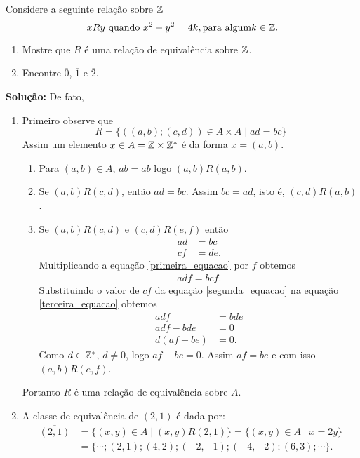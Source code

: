 \documentclass[12pt]{article}
\begin{document}
\vspace{.5cm}

\questao Considere a seguinte relação sobre $\mathbb{Z}$
\[
	xRy \mbox{ quando } x^2 - y^2 = 4k, \mbox{para algum} k \in \mathbb{Z}.
\]

\begin{enumerate}[label={\alph*})]
	\item Mostre que $R$ é uma rela{\c c}{\~a}o de equival{\^e}ncia sobre $\mathbb{Z}$.
	\item Encontre $\overline{0}$, $\overline{1}$ e $\overline{2}$.
\end{enumerate}

\noindent\textbf{Solu\c{c}\~ao:} De fato,
	\begin{enumerate}[label={\alph*})]
		\item Primeiro observe que
		\[
			R = \{((a,b);(c,d)) \in A \times A \mid ad = bc\}
		\]
		Assim um elemento $x \in A = \mathbb{Z}\times\mathbb{Z}^*$ é da forma $x = (a,b)$.
		\begin{enumerate}[label={\roman*})]
			\item Para $(a,b) \in A$, $ab = ab$ logo $(a,b)R(a,b)$.
			\item Se $(a,b)R(c,d)$, então $ad = bc$. Assim $bc = ad$, isto é, $(c,d)R(a,b)$.
			\item Se $(a,b)R(c,d)$ e $(c,d)R(e,f)$ então
			\begin{align}
				ad &= bc\label{primeira_equacao}\\
				cf &= de.\label{segunda_equacao}
			\end{align}
			Multiplicando a equação \eqref{primeira_equacao} por $f$ obtemos
			\begin{align}\label{terceira_equacao}
				adf = bcf.
			\end{align}
			Substituindo o valor de $cf$ da equação \eqref{segunda_equacao} na equação \eqref{terceira_equacao} obtemos
			\begin{align*}
				adf &= bde\\
				adf - bde &= 0\\
				d(af - be) &= 0.
			\end{align*}
			Como $d \in \mathbb{Z}^*$, $d \ne 0$, logo $af - be = 0$. Assim $af = be$ e com isso $(a,b)R(e,f)$.
		\end{enumerate}

		Portanto $R$ é uma relação de equivalência sobre $A$.

		\item A classe de equivalência de $\overline{(2,1)}$ é dada por:
		\begin{align*}
			\overline{(2,1)} &= \{(x,y) \in A \mid (x,y)R(2,1)\} = \{(x,y) \in A \mid x = 2y\} \\
			&= \{\cdots; (2,1); (4,2); (-2,-1);(-4,-2);(6,3);\cdots\}.
		\end{align*}
	\end{enumerate}
\end{document}
